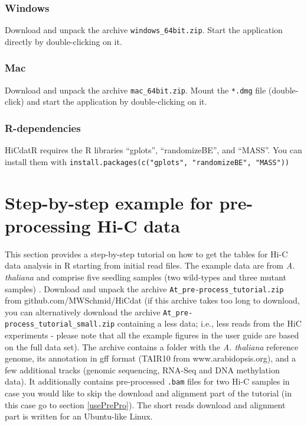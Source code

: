 \documentclass[a4paper,10pt]{article}
\newcommand{\myWeb}{github.com/MWSchmid/HiCdat}
\begin{document}
\subsubsection{Windows}
Download and unpack the archive \texttt{windows\_64bit.zip}. Start the application directly by double-clicking on it.
\subsubsection{Mac}
Download and unpack the archive \texttt{mac\_64bit.zip}. Mount the \texttt{*.dmg} file (double-click) and start the application by double-clicking on it. %
\subsubsection{R-dependencies}
HiCdatR requires the R libraries ``gplots'', ``randomizeBE'', and ``MASS''. You can install them with \texttt{install.packages(c("gplots", "randomizeBE", "MASS"))}
\clearpage
\section{Step-by-step example for pre-processing Hi-C data}
This section provides a step-by-step tutorial on how to get the tables for Hi-C data analysis in R starting from initial read files. The example data are from \textit{A. thaliana} and comprise five seedling samples (two wild-types and three mutant samples) \cite{2012_Moissiard,2014_Grob}. Download and unpack the archive \texttt{At\_pre-process\_tutorial.zip} from {\myWeb} (if this archive takes too long to download, you can alternatively download the archive \texttt{At\_pre-process\_tutorial\_small.zip} containing a less data; i.e., less reads from the HiC experiments - please note that all the example figures in the user guide are based on the full data set). The archive contains a folder with the \textit{A. thaliana} reference genome, its annotation in gff format (TAIR10 from www.arabidopsis.org), and a few additional tracks (genomic sequencing, RNA-Seq and DNA methylation data). It additionally contains pre-processed \texttt{.bam} files for two Hi-C samples in case you would like to skip the download and alignment part of the tutorial (in this case go to section \ref{usePrePro}). The short reads download and alignment part is written for an Ubuntu-like Linux.
\end{document}
